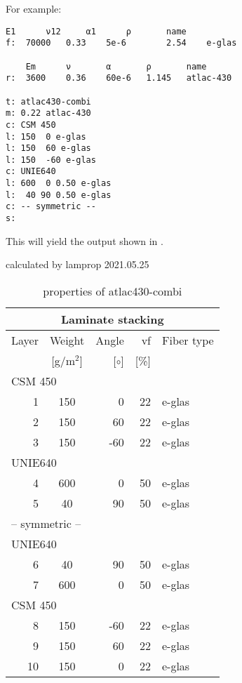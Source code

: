 \documentclass[a4paper,landscape,oneside,11pt,twocolumn]{memoir}
\begin{document}
For example:
\begin{lstlisting}[style=plain]
    E1      ν12     α1      ρ       name
f:  70000   0.33    5e-6        2.54    e-glas

    Em      ν       α       ρ       name
r:  3600    0.36    60e-6   1.145   atlac-430

t: atlac430-combi
m: 0.22 atlac-430
c: CSM 450
l: 150  0 e-glas
l: 150  60 e-glas
l: 150  -60 e-glas
c: UNIE640
l: 600  0 0.50 e-glas
l:  40 90 0.50 e-glas
c: -- symmetric --
s:
\end{lstlisting}

This will yield the output shown in .

\begin{table}[!htbp]
  \renewcommand{\arraystretch}{1.2}
  \caption{\label{tab:atlac430-combi}properties of atlac430-combi}
  \centering\footnotesize{\rule{0pt}{10pt}
  \tiny calculated by lamprop 2021.05.25\\[3pt]}
    \renewcommand{\arraystretch}{1.0}
    \begin{tabular}[t]{rcrrl}
      \multicolumn{5}{c}{\small\textbf{Laminate stacking}}\\[0.1em]
      \toprule %
      Layer & Weight & Angle & vf & Fiber type\\
            & [g/m$^2$] & [$\circ$] & [\%]\\
      \midrule
\multicolumn{5}{l}{CSM 450}\\
      1 &  150 &     0 & 22 & e-glas\\
      2 &  150 &    60 & 22 & e-glas\\
      3 &  150 &   -60 & 22 & e-glas\\
\multicolumn{5}{l}{UNIE640}\\
      4 &  600 &     0 & 50 & e-glas\\
      5 &   40 &    90 & 50 & e-glas\\
\multicolumn{5}{l}{-- symmetric --}\\
\multicolumn{5}{l}{UNIE640}\\
      6 &   40 &    90 & 50 & e-glas\\
      7 &  600 &     0 & 50 & e-glas\\
\multicolumn{5}{l}{CSM 450}\\
      8 &  150 &   -60 & 22 & e-glas\\
      9 &  150 &    60 & 22 & e-glas\\
      10 &  150 &     0 & 22 & e-glas\\

\end{tabular}
\end{table}
\end{document}
